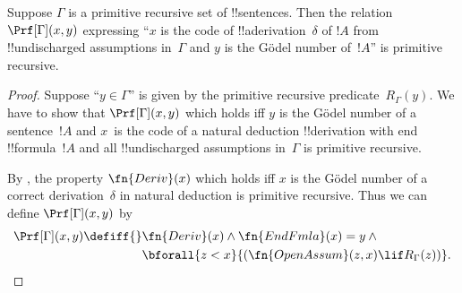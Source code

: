 \documentclass[../../../include/open-logic-section]{subfiles}
\begin{document}
\begin{prop}
  Suppose $\Gamma$ is a primitive recursive set of !!{sentence}s.
  Then the relation $\Prf[\Gamma](x, y)$ expressing ``$x$ is the code
  of !!a{derivation}~$\delta$ of $!A$ from !!{undischarged}
  assumptions in~$\Gamma$ and $y$ is the G\"odel number of~$!A$'' is
  primitive recursive.
\end{prop}

\begin{proof}
  Suppose ``$y \in \Gamma$'' is given by the primitive recursive
  predicate~$R_\Gamma(y)$.  We have to show that $\Prf[\Gamma](x, y)$
  which holds iff $y$ is the G\"odel number of a sentence~$!A$ and
  $x$~is the code of a natural deduction !!{derivation} with end
  !!{formula}~$!A$ and all !!{undischarged} assumptions in~$\Gamma$ is
  primitive recursive.

  By , the property $\fn{Deriv}(x)$ which holds iff
  $x$ is the G\"odel number of a correct derivation~$\delta$ in
  natural deduction is primitive recursive. Thus we can define
  $\Prf[\Gamma](x, y)$ by
  \begin{align*}
    \Prf[\Gamma](x, y) \defiff {}
    & \fn{Deriv}(x) \land \fn{EndFmla}(x) = y \land {} \\
    & \bforall{z < x}{(\fn{OpenAssum}(z, x) \lif R_\Gamma(z))}.
  \end{align*}
\end{proof}
\end{document}
